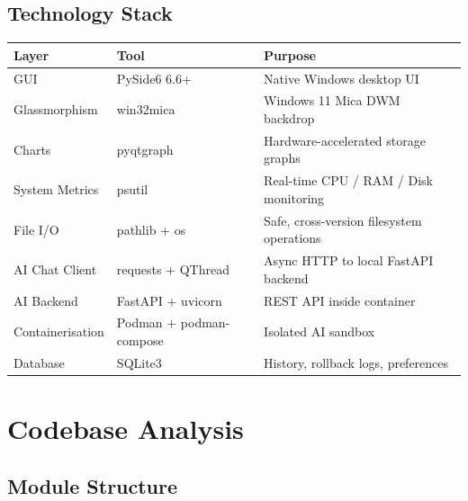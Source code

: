 \documentclass[11pt,a4paper]{article}
\begin{document}
\subsection{Technology Stack}

\begin{table}[h]
\centering
\begin{tabular}{llp{6cm}}
\toprule
\textbf{Layer} & \textbf{Tool} & \textbf{Purpose} \\
\midrule
GUI & PySide6 6.6+ & Native Windows desktop UI \\
Glassmorphism & win32mica & Windows 11 Mica DWM backdrop \\
Charts & pyqtgraph & Hardware-accelerated storage graphs \\
System Metrics & psutil & Real-time CPU / RAM / Disk monitoring \\
File I/O & pathlib + os & Safe, cross-version filesystem operations \\
AI Chat Client & requests + QThread & Async HTTP to local FastAPI backend \\
AI Backend & FastAPI + uvicorn & REST API inside container \\
Containerisation & Podman + podman-compose & Isolated AI sandbox \\
Database & SQLite3 & History, rollback logs, preferences \\
\bottomrule
\end{tabular}
\end{table}

\section{Codebase Analysis}

\subsection{Module Structure}
\end{document}
